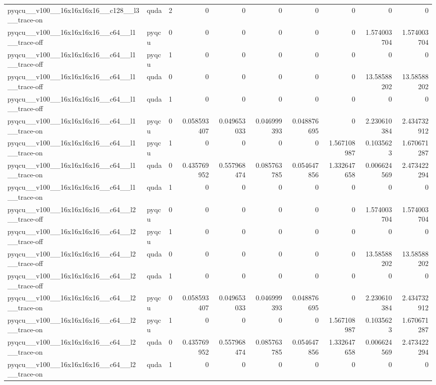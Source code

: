 \begin{table}[htbp]
\begin{tabular}{@{}llrrrrrrrr@{}}
pyqcu\_\_v100\_\_16x16x16x16\_\_c128\_\_l3\_\_trace-on & quda & 2 & 0 & 0 & 0 & 0 & 0 & 0 & 0 \\
pyqcu\_\_v100\_\_16x16x16x16\_\_c64\_\_l1\_\_trace-off & pyqcu & 0 & 0 & 0 & 0 & 0 & 0 & 1.574003704 & 1.574003704 \\
pyqcu\_\_v100\_\_16x16x16x16\_\_c64\_\_l1\_\_trace-off & pyqcu & 1 & 0 & 0 & 0 & 0 & 0 & 0 & 0 \\
pyqcu\_\_v100\_\_16x16x16x16\_\_c64\_\_l1\_\_trace-off & quda & 0 & 0 & 0 & 0 & 0 & 0 & 13.58588202 & 13.58588202 \\
pyqcu\_\_v100\_\_16x16x16x16\_\_c64\_\_l1\_\_trace-off & quda & 1 & 0 & 0 & 0 & 0 & 0 & 0 & 0 \\
pyqcu\_\_v100\_\_16x16x16x16\_\_c64\_\_l1\_\_trace-on & pyqcu & 0 & 0.058593407 & 0.049653033 & 0.046999393 & 0.048876695 & 0 & 2.230610384 & 2.434732912 \\
pyqcu\_\_v100\_\_16x16x16x16\_\_c64\_\_l1\_\_trace-on & pyqcu & 1 & 0 & 0 & 0 & 0 & 1.567108987 & 0.1035623 & 1.670671287 \\
pyqcu\_\_v100\_\_16x16x16x16\_\_c64\_\_l1\_\_trace-on & quda & 0 & 0.435769952 & 0.557968474 & 0.085763785 & 0.054647856 & 1.332647658 & 0.006624569 & 2.473422294 \\
pyqcu\_\_v100\_\_16x16x16x16\_\_c64\_\_l1\_\_trace-on & quda & 1 & 0 & 0 & 0 & 0 & 0 & 0 & 0 \\
pyqcu\_\_v100\_\_16x16x16x16\_\_c64\_\_l2\_\_trace-off & pyqcu & 0 & 0 & 0 & 0 & 0 & 0 & 1.574003704 & 1.574003704 \\
pyqcu\_\_v100\_\_16x16x16x16\_\_c64\_\_l2\_\_trace-off & pyqcu & 1 & 0 & 0 & 0 & 0 & 0 & 0 & 0 \\
pyqcu\_\_v100\_\_16x16x16x16\_\_c64\_\_l2\_\_trace-off & quda & 0 & 0 & 0 & 0 & 0 & 0 & 13.58588202 & 13.58588202 \\
pyqcu\_\_v100\_\_16x16x16x16\_\_c64\_\_l2\_\_trace-off & quda & 1 & 0 & 0 & 0 & 0 & 0 & 0 & 0 \\
pyqcu\_\_v100\_\_16x16x16x16\_\_c64\_\_l2\_\_trace-on & pyqcu & 0 & 0.058593407 & 0.049653033 & 0.046999393 & 0.048876695 & 0 & 2.230610384 & 2.434732912 \\
pyqcu\_\_v100\_\_16x16x16x16\_\_c64\_\_l2\_\_trace-on & pyqcu & 1 & 0 & 0 & 0 & 0 & 1.567108987 & 0.1035623 & 1.670671287 \\
pyqcu\_\_v100\_\_16x16x16x16\_\_c64\_\_l2\_\_trace-on & quda & 0 & 0.435769952 & 0.557968474 & 0.085763785 & 0.054647856 & 1.332647658 & 0.006624569 & 2.473422294 \\
pyqcu\_\_v100\_\_16x16x16x16\_\_c64\_\_l2\_\_trace-on & quda & 1 & 0 & 0 & 0 & 0 & 0 & 0 & 0 \\

\end{tabular}
\end{table}
